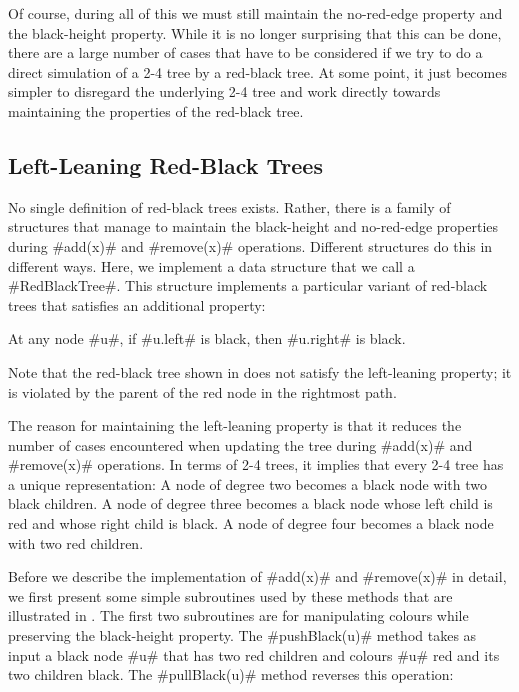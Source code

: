 Of course, during all of this we must still maintain the no-red-edge
property and the black-height property.  While it is no longer surprising
that this can be done, there are a large number of cases that have to
be considered if we try to do a direct simulation of a 2-4 tree by a
red-black tree.  At some point, it just becomes simpler to disregard the
underlying 2-4 tree and work directly towards maintaining the properties
of the red-black tree.

\subsection{Left-Leaning Red-Black Trees}

%
%
No single definition of red-black trees exists.  Rather, there is
a family of structures that manage to maintain the black-height
and no-red-edge properties during #add(x)# and #remove(x)#
operations. Different structures do this in different ways.
Here, we implement a data structure that we call a #RedBlackTree#.
%
This structure implements a particular variant of red-black trees that
satisfies an additional property:
\begin{prp}
  At any node #u#, if #u.left# is black, then #u.right# is black.
\end{prp}
Note that the red-black tree shown in   does
not satisfy the left-leaning property;  it is violated by the parent of
the red node in the rightmost path.

The reason for maintaining the left-leaning property is that it reduces
the number of cases encountered when updating the tree during #add(x)#
and #remove(x)# operations.  In terms of 2-4 trees, it implies that every
2-4 tree has a unique representation:  A node of degree two becomes
a black node with two black children.  A node of degree three becomes
a black node whose left child is red and whose right child is black.
A node of degree four becomes a black node with two red children.

Before we describe the implementation of #add(x)# and #remove(x)# in
detail, we first present some simple subroutines used by these methods
that are illustrated in .  The first two
subroutines are for manipulating colours while preserving the black-height
property. The #pushBlack(u)# method takes as input a black node #u#
that has two red children and colours #u# red and its two children black.
The #pullBlack(u)# method reverses this operation:

